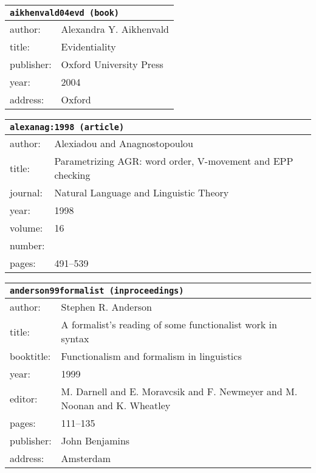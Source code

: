 \documentclass{article}
\begin{document}
\bigskip

\begin{tabular}{p{}p{}}
\multicolumn{2}{l}{\texttt{aikhenvald04evd (book)}}\\
\hline
author: & Alexandra Y. Aikhenvald\\
title: & Evidentiality\\
publisher: & Oxford University Press\\
year: & 2004\\
address: & Oxford\\
\end{tabular}

\bigskip

\begin{tabular}{p{}p{}}
\multicolumn{2}{l}{\texttt{alexanag:1998 (article)}}\\
\hline
author: & Alexiadou and Anagnostopoulou\\
title: & Parametrizing AGR: word order, V-movement and EPP checking\\
journal: & Natural Language and Linguistic Theory\\
year: & 1998\\
volume: & 16\\
number: & \\
pages: & 491--539\\
\end{tabular}

\bigskip

\begin{tabular}{p{}p{}}
\multicolumn{2}{l}{\texttt{anderson99formalist (inproceedings)}}\\
\hline
author: & Stephen R. Anderson\\
title: & A formalist's reading of some functionalist work in syntax\\
booktitle: & Functionalism and formalism in linguistics\\
year: & 1999\\
editor: & M. Darnell and E. Moravcsik and F. Newmeyer and M. Noonan and K. Wheatley\\
pages: & 111--135\\
publisher: & John Benjamins\\
address: & Amsterdam\\
\end{tabular}

\bigskip
\end{document}
